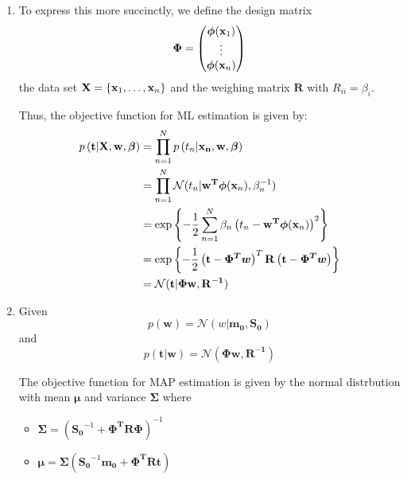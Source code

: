 \documentclass[reqno]{amsart}
\begin{document}
\begin{enumerate}[label=\textbf{(\Roman*)}]
        \begin{enumerate}[label=\textbf{(\alph*)}]
            \item To express this more succinctly, we define the design matrix \[\boldsymbol{\Phi} = \begin{pmatrix}\boldsymbol{\phi}(\mathbf{x}_1) \\ \vdots \\ \boldsymbol{\phi}(\mathbf{x}_n)\end{pmatrix} \]
            the data set \(\mathbf{X} = \left\{\mathbf{x}_1, \ldots, \mathbf{x}_{n}\right\}\)
            and the weighing matrix \(\mathbf{R}\) with \(R_{ii} = \beta_i\).
            
            Thus, the objective function for ML estimation is given by:
            \begin{align}
                \begin{split}
                    p\left({\mathbf{t}} \middle| {\mathbf{X}, \mathbf{w}, \boldsymbol{\beta}}\right)  
                    &= \prod_{n = 1}^{N} p\left(t_n | \mathbf{x_n}, \mathbf{w}, \boldsymbol{\beta}\right) \\
                    &= \prod_{n = 1}^{N} \mathcal{N} (t_n | \mathbf{w^T} \boldsymbol{\phi}(\mathbf{x}_n), \beta_n^{-1}) \\
                    &= \exp \left\{- \frac{1}{2} \sum_{n = 1}^{N} \beta_n \left(t_n - \mathbf{w^T} \boldsymbol{\phi}(\mathbf{x}_n)\right)^2\right\} \\
                    &= \exp \left\{- \frac{1}{2} \left(\mathbf{t} - \boldsymbol{\Phi^T w}\right)^T \mathbf{R} \left(\mathbf{t} - \boldsymbol{\Phi^T w}\right)\right\} \\
                    &= \mathcal{N} (\mathbf{t}|\mathbf{\Phi w, R^{-1}}) \label{eq:ml} 
                \end{split}
            \end{align}
            \item 
                Given
                    \[p(\mathbf{w}) = \mathcal{N}(w|\mathbf{m_0, S_0})\]
                and
                    \[p(\mathbf{t|w}) = \mathcal{N}(\mathbf{\Phi w, R^{-1}})\]


                The objective function for MAP estimation is given by the normal distrbution with mean \(\boldsymbol{\mu}\) and variance \(\boldsymbol{\Sigma}\) where 

                \begin{itemize}
                    \item \(\boldsymbol{\Sigma} = (\mathbf{S_0}^{-1} + \mathbf{\Phi^T R \Phi})^{-1}\)
                    \item \(\boldsymbol{\mu} = \boldsymbol{\Sigma} (\mathbf{S_0}^{-1} \mathbf{m_0} + \mathbf{\Phi^T R t})\)
                \end{itemize}


\end{enumerate}
\end{enumerate}
\end{document}
